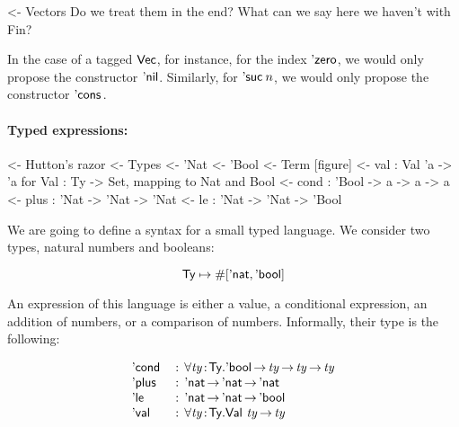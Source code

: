 \begin{wstructure}
<- Vectors
    Do we treat them in the end? 
    What can we say here we haven't with Fin?
\end{wstructure}

In the case of a tagged $\D{Vec}$, for instance, for the index
$\NatZero$, we would only propose the constructor
$\ListNil$. Similarly, for $\NatSuc{n}$, we would only propose the
constructor $\ListCons{\!}{\!}$.
 
\paragraph{Typed expressions:}

\begin{wstructure}
<- Hutton's razor
    <- Types
        <- 'Nat
        <- 'Bool
    <- Term [figure]
        <- val : Val 'a -> 'a  for Val : Ty -> Set, mapping to Nat and Bool
        <- cond : 'Bool -> a -> a -> a
        <- plus : 'Nat -> 'Nat -> 'Nat
        <- le : 'Nat -> 'Nat -> 'Bool
\end{wstructure}

\newcommand{\Ty}{\C{Ty}}
\newcommand{\Ebool}{\etag{\CN{bool}}}
\newcommand{\Enat}{\etag{\CN{nat}}}

\newcommand{\Eval}[1]{\etag{\CN{val}}~#1}
\newcommand{\Econd}[3]{\etag{\CN{cond}}~#1~#2~#3}
\newcommand{\Eplus}[2]{\etag{\CN{plus}}~#1~#2}
\newcommand{\Ele}[2]{\etag{\CN{le}}~#1~#2}

\newcommand{\Val}[1]{\F{Val}~#1}
\newcommand{\Var}[2]{\F{Var}_{#1}~#2}

\newcommand{\HExprD}{\C{ExprD}}
\newcommand{\HExprAD}{\C{ExprAD}}
\newcommand{\HExprID}{\C{ExprID}}
\newcommand{\HExprVarD}[1]{\C{ExprD}_{\F{Var},#1}}
\newcommand{\HExprFreeD}{\C{ExprD}^{\C{Free}}}
\newcommand{\HExprAFreeD}{\C{ExprAD}^{\C{Free}}}

We are going to define a syntax for a small typed language. We
consider two types, natural numbers and booleans:

\[
\Ty \mapsto \EnumT{[\Enat, \Ebool]}
\]

An expression of this language is either a value, a conditional
expression, an addition of numbers, or a comparison of
numbers. Informally, their type is the following:

\[
\begin{array}{l@{\::\:\:}l}
\Econd{}{}{}     & \forall \Bhab{\V{ty}}{\Ty} . \Ebool \To \V{ty} \To \V{ty} \To \V{ty}  \\ 
\Eplus{}{}       & \Enat \To \Enat \To \Enat                           \\
\Ele{}{}         & \Enat \To \Enat \To \Ebool                          \\
\Eval{}          & \forall \Bhab{\V{ty}}{\Ty} . \Val{\V{ty}} \To \V{ty}
\end{array}
\]

